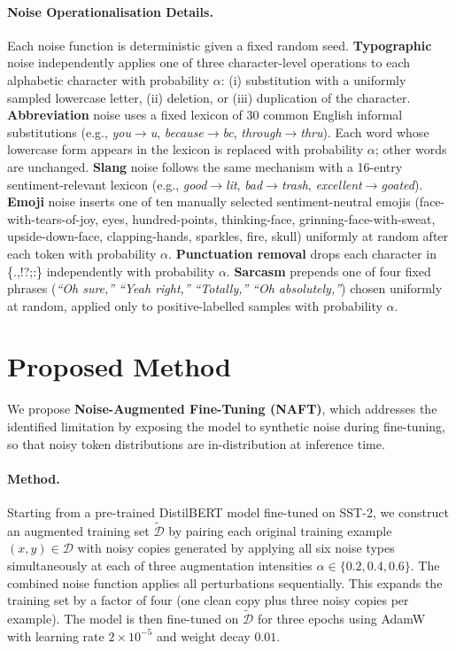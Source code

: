 \documentclass[sigconf]{acmart}
\begin{document}
\paragraph{Noise Operationalisation Details.}
Each noise function is deterministic given a fixed random seed.
\textbf{Typographic} noise independently applies one of three
character-level operations to each alphabetic character with
probability $\alpha$: (i) substitution with a uniformly sampled
lowercase letter, (ii) deletion, or (iii) duplication of the
character.
\textbf{Abbreviation} noise uses a fixed lexicon of 30 common
English informal substitutions (e.g., \textit{you}$\to$\textit{u},
\textit{because}$\to$\textit{bc}, \textit{through}$\to$\textit{thru}).
Each word whose lowercase form appears in the lexicon is replaced
with probability $\alpha$; other words are unchanged.
\textbf{Slang} noise follows the same mechanism with a 16-entry
sentiment-relevant lexicon (e.g., \textit{good}$\to$\textit{lit},
\textit{bad}$\to$\textit{trash}, \textit{excellent}$\to$\textit{goated}).
\textbf{Emoji} noise inserts one of ten manually selected
sentiment-neutral emojis (face-with-tears-of-joy, eyes, hundred-points,
thinking-face, grinning-face-with-sweat, upside-down-face,
clapping-hands, sparkles, fire, skull) uniformly at random after
each token with probability $\alpha$.
\textbf{Punctuation removal} drops each character in
\{.,!?;:\} independently with probability $\alpha$.
\textbf{Sarcasm} prepends one of four fixed phrases
(\textit{``Oh sure,''} \textit{``Yeah right,''} \textit{``Totally,''} \textit{``Oh absolutely,''})
chosen uniformly at random, applied only to positive-labelled
samples with probability $\alpha$.

\section{Proposed Method}

We propose \textbf{Noise-Augmented Fine-Tuning (NAFT)}, which
addresses the identified limitation by exposing the model to
synthetic noise during fine-tuning, so that noisy token
distributions are in-distribution at inference time.

\paragraph{Method.}
Starting from a pre-trained DistilBERT model fine-tuned on SST-2,
we construct an augmented training set $\tilde{\mathcal{D}}$ by
pairing each original training example $(x, y) \in \mathcal{D}$
with noisy copies generated by applying all six noise types
simultaneously at each of three augmentation intensities
$\alpha \in \{0.2, 0.4, 0.6\}$.
The combined noise function applies all perturbations sequentially.
This expands the training set by a factor of four (one clean copy
plus three noisy copies per example).
The model is then fine-tuned on $\tilde{\mathcal{D}}$ for three
epochs using AdamW with learning rate $2 \times 10^{-5}$ and
weight decay $0.01$.
\end{document}

